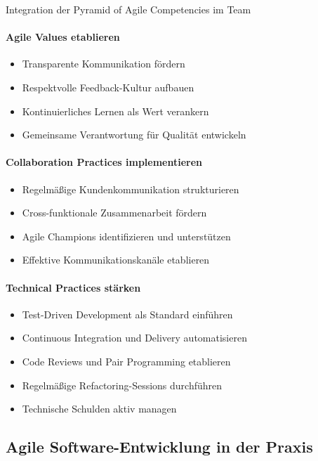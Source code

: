 \begin{KR}{Integration der Pyramid of Agile Competencies im Team}\\
    \paragraph{Agile Values etablieren}
    \begin{itemize}
        \item Transparente Kommunikation fördern
        \item Respektvolle Feedback-Kultur aufbauen
        \item Kontinuierliches Lernen als Wert verankern
        \item Gemeinsame Verantwortung für Qualität entwickeln
    \end{itemize}
    
    \paragraph{Collaboration Practices implementieren}
    \begin{itemize}
        \item Regelmäßige Kundenkommunikation strukturieren
        \item Cross-funktionale Zusammenarbeit fördern
        \item Agile Champions identifizieren und unterstützen
        \item Effektive Kommunikationskanäle etablieren
    \end{itemize}
    
    \paragraph{Technical Practices stärken}
    \begin{itemize}
        \item Test-Driven Development als Standard einführen
        \item Continuous Integration und Delivery automatisieren
        \item Code Reviews und Pair Programming etablieren
        \item Regelmäßige Refactoring-Sessions durchführen
        \item Technische Schulden aktiv managen
    \end{itemize}
\end{KR}

\subsection{Agile Software-Entwicklung in der Praxis}

